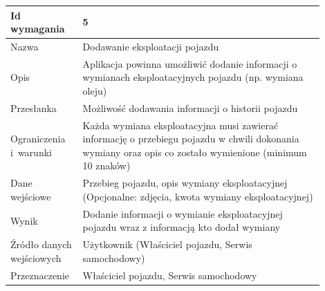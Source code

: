 \documentclass[12pt]{article}
\begin{document}
\begin{table}[H]
\begin{center}
	\begin{tabular}{|p{0.18\linewidth}|p{0.72\linewidth}|}%
	\hline
	Id wymagania 	& 5 				\\ \hline
	Nazwa			& Dodawanie eksploatacji pojazdu \\ \hline
	Opis &
	
	 Aplikacja powinna umożliwić dodanie informacji o wymianach eksploatacyjnych pojazdu (np. wymiana oleju)
	 
\\ \hline
	Przesłanka & 

Możliwość dodawania informacji o historii pojazdu

  \\ \hline
	Ograniczenia i~warunki & 

Każda wymiana eksploatacyjna musi zawierać informację o przebiegu pojazdu w chwili dokonania wymiany oraz opis co zostało wymienione (minimum 10 znaków)

 \\ \hline
	Dane wejściowe &

Przebieg pojazdu, opis wymiany eksploatacyjnej
(Opcjonalne: zdjęcia, kwota wymiany eksploatacyjnej)

 \\ \hline
	Wynik & 
	
Dodanie informacji o wymianie eksploatacyjnej pojazdu wraz z informacją kto dodał wymiany

\\ \hline
	Źródło danych wejściowych &
	
Użytkownik (Właściciel pojazdu, Serwis samochodowy)
\\ \hline

	Przeznaczenie & 
	
Właściciel pojazdu, Serwis samochodowy

\\ \hline
	\end{tabular}

\end{center}
\end{table}
\end{document}
